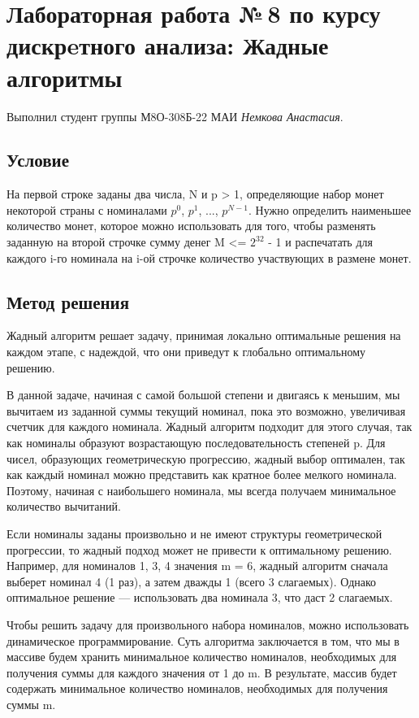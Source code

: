 \documentclass[12pt]{article}
\begin{document}
\section*{Лабораторная работа №\,8 по курсу дискрeтного анализа: Жадные алгоритмы}

Выполнил студент группы М8О-308Б-22 МАИ \textit{Немкова Анастасия}.

\subsection*{Условие}
На первой строке заданы два числа, N и p > 1, определяющие набор монет некоторой страны с номиналами $p^0$, $p^1$, ..., $p^{N-1}$. Нужно определить наименьшее количество монет, которое можно использовать для того, чтобы разменять заданную на второй строчке сумму денег M <=  $2^{32}$ - 1 и распечатать для каждого i-го номинала на i-ой строчке количество участвующих в размене монет.

\subsection*{Метод решения}

Жадный алгоритм решает задачу, принимая локально оптимальные решения на каждом этапе, с надеждой, что они приведут к глобально оптимальному решению.

В данной задаче, начиная с самой большой степени и двигаясь к меньшим, мы вычитаем из заданной суммы текущий номинал, пока это возможно, увеличивая счетчик для каждого номинала. Жадный алгоритм подходит для этого случая, так как номиналы образуют возрастающую последовательность степеней p. Для чисел, образующих геометрическую прогрессию, жадный выбор оптимален, так как каждый номинал можно представить как кратное более мелкого номинала. Поэтому, начиная с наибольшего номинала, мы всегда получаем минимальное количество вычитаний.

Если номиналы заданы произвольно и не имеют структуры геометрической прогрессии, то жадный подход может не привести к оптимальному решению. Например, для номиналов 1, 3, 4 значения m = 6, жадный алгоритм сначала выберет номинал 4 (1 раз), а затем дважды 1 (всего 3 слагаемых). Однако оптимальное решение — использовать два номинала 3, что даст 2 слагаемых.

Чтобы решить задачу для произвольного набора номиналов, можно использовать динамическое программирование. Суть алгоритма заключается  в том, что мы в массиве будем хранить минимальное количество номиналов, необходимых для получения суммы для каждого значения от 1 до m. В результате, массив будет содержать минимальное количество номиналов, необходимых для получения суммы m.
\end{document}
